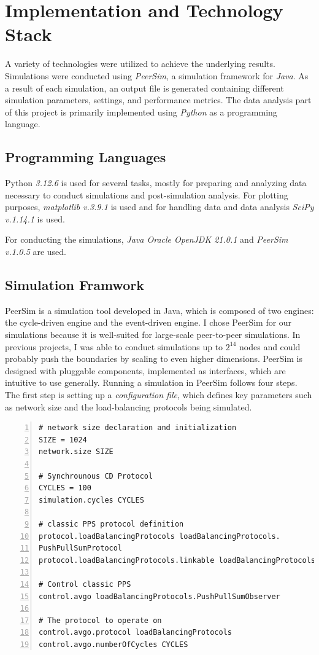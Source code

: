 \chapter{Implementation and Technology Stack}\label{chap:implementation}
A variety of technologies were utilized to achieve the underlying results. Simulations were conducted using \textit{PeerSim}, a simulation framework for \textit{Java}. As a result of each simulation, an output file is generated containing different simulation parameters, settings, and performance metrics. The data analysis part of this project is primarily implemented using \textit{Python} as a programming language.

\section{Programming Languages}\label{sec:proglangs}
Python \textit{3.12.6} is used for several tasks, mostly for preparing and analyzing data necessary to conduct simulations and post-simulation analysis. For plotting purposes, \textit{matplotlib v.3.9.1} is used and for handling data and data analysis \textit{SciPy v.1.14.1} is used.

For conducting the simulations, \textit{Java Oracle OpenJDK 21.0.1} and \textit{PeerSim v.1.0.5} are used.

\section{Simulation Framwork}\label{sec:simulationframework}
PeerSim is a simulation tool developed in Java, which is composed of two engines: the cycle-driven engine and the event-driven engine. I chose PeerSim for our simulations because it is well-suited for large-scale peer-to-peer simulations. In previous projects, I was able to conduct simulations up to $2^{14}$ nodes and could probably push the boundaries by scaling to even higher dimensions. PeerSim is designed with pluggable components, implemented as interfaces, which are intuitive to use generally. Running a simulation in PeerSim follows four steps. The first step is setting up a \textit{configuration file}, which defines key parameters such as network size and the load-balancing protocols being simulated.

\begin{lstlisting}[caption=Example configuration, captionpos=b, numbers=left, label=lst:exampleConfig]
# network size declaration and initialization
SIZE = 1024
network.size SIZE

# Synchrounous CD Protocol
CYCLES = 100
simulation.cycles CYCLES

# classic PPS protocol definition
protocol.loadBalancingProtocols loadBalancingProtocols.
PushPullSumProtocol
protocol.loadBalancingProtocols.linkable loadBalancingProtocols

# Control classic PPS
control.avgo loadBalancingProtocols.PushPullSumObserver

# The protocol to operate on
control.avgo.protocol loadBalancingProtocols
control.avgo.numberOfCycles CYCLES
\end{lstlisting}

